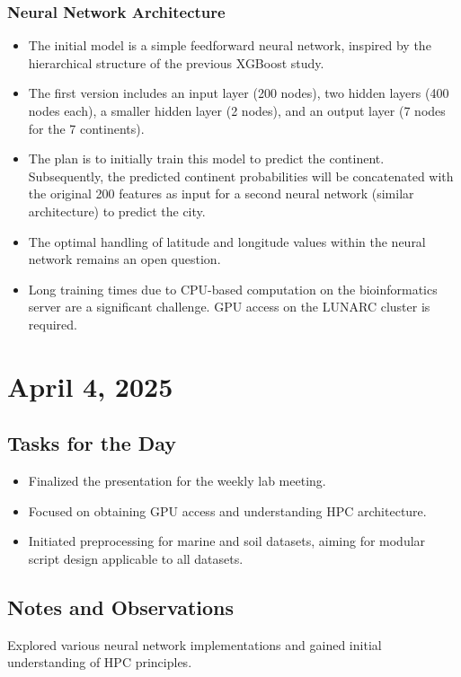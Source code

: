 \documentclass{article}
\begin{document}
\subsubsection*{Neural Network Architecture}
\begin{itemize}
    \item The initial model is a simple feedforward neural network, inspired by the hierarchical structure of the previous XGBoost study.
    \item The first version includes an input layer (200 nodes), two hidden layers (400 nodes each), a smaller hidden layer (2 nodes), and an output layer (7 nodes for the 7 continents).
    \item The plan is to initially train this model to predict the continent. Subsequently, the predicted continent probabilities will be concatenated with the original 200 features as input for a second neural network (similar architecture) to predict the city.
    \item The optimal handling of latitude and longitude values within the neural network remains an open question.
    \item Long training times due to CPU-based computation on the bioinformatics server are a significant challenge. GPU access on the LUNARC cluster is required.
\end{itemize}

\section{April 4, 2025}

\subsection*{Tasks for the Day}
\begin{itemize}
    \item Finalized the presentation for the weekly lab meeting.
    \item Focused on obtaining GPU access and understanding HPC architecture.
    \item Initiated preprocessing for marine and soil datasets, aiming for modular script design applicable to all datasets.
\end{itemize}

\subsection*{Notes and Observations}
Explored various neural network implementations and gained initial understanding of HPC principles.
\end{document}
